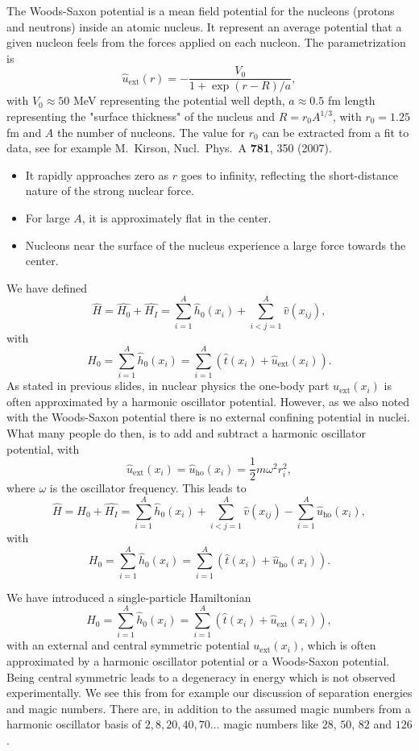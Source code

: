 \begin{itemize}
The Woods-Saxon potential is a mean field potential for the nucleons (protons and neutrons) 
inside an atomic nucleus. It represent an average potential that a given nucleon feels from  the forces applied on each nucleon. 
The parametrization is
\[
\hat{u}_{\mathrm{ext}}(r)=-\frac{V_0}{1+\exp{(r-R)/a}},
\]
with $V_0\approx 50$ MeV representing the potential well depth, $a\approx 0.5$ fm 
length representing the "surface thickness" of the nucleus and $R=r_0A^{1/3}$, with $r_0=1.25$ fm and $A$ the number of nucleons.
The value for $r_0$ can be extracted from a fit to data, see for example M.~Kirson, Nucl.~Phys.~A {\bf 781}, 350 (2007).
\begin{itemize}
\item It rapidly approaches zero as $r$ goes to infinity, reflecting the short-distance nature of the strong nuclear force.
\item For large $A$, it is approximately flat in the center.
\item Nucleons near the surface of the nucleus experience a large force towards the center.
\end{itemize}
We have defined
\[
    \hat{H} = \hat{H_0} + \hat{H_I} 
    = \sum_{i=1}^A \hat{h}_0(x_i) + \sum_{i<j=1}^A \hat{v}(x_{ij}),
\]
with 
\[
  H_0=\sum_{i=1}^A \hat{h}_0(x_i) =  \sum_{i=1}^A\left(\hat{t}(x_i) + \hat{u}_{\mathrm{ext}}(x_i)\right).
\]
As stated in previous slides, 
in nuclear physics the one-body part $u_{\mathrm{ext}}(x_i)$ is often 
approximated by a harmonic oscillator potential. However,  as we also noted with the Woods-Saxon potential there is no 
external confining potential in nuclei. 
What many people do then, is to add and subtract a harmonic oscillator potential,
with 
\[
\hat{u}_{\mathrm{ext}}(x_i)=\hat{u}_{\mathrm{ho}}(x_i)= \frac{1}{2}m\omega^2 r_i^2,
\]
where $\omega$ is the oscillator frequency. This leads to 
\[
    \hat{H} = \hat{H_0} + \hat{H_I} 
    = \sum_{i=1}^A \hat{h}_0(x_i) + \sum_{i<j=1}^A \hat{v}(x_{ij})-\sum_{i=1}^A\hat{u}_{\mathrm{ho}}(x_i),
\]
with 
\[
  H_0=\sum_{i=1}^A \hat{h}_0(x_i) =  \sum_{i=1}^A\left(\hat{t}(x_i) + \hat{u}_{\mathrm{ho}}(x_i)\right).
\]











We have introduced a single-particle Hamiltonian
\[
  H_0=\sum_{i=1}^A \hat{h}_0(x_i) =  \sum_{i=1}^A\left(\hat{t}(x_i) + \hat{u}_{\mathrm{ext}}(x_i)\right),
\]
with an external and central symmetric potential $u_{\mathrm{ext}}(x_i)$, which is often 
approximated by a harmonic oscillator potential or a Woods-Saxon potential. Being central symmetric leads to a degeneracy 
in energy which is not observed experimentally. We see this from for example our discussion of separation energies and magic numbers. There are, in addition to the assumed magic numbers from a harmonic oscillator basis of $2,8,20,40,70\dots$ magic numbers like $28$, $50$, $82$ and $126$. 


\end{itemize}
